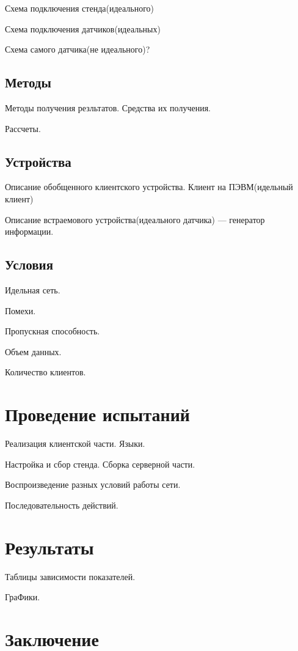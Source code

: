 \documentclass[russian]{article}
\begin{document}
Схема подключения стенда(идеального)

Схема подключения датчиков(идеальных)

Схема самого датчика(не идеального)?

\subsection*{Методы}

Методы получения резльтатов. Средства их получения.

Рассчеты.

\subsection*{Устройства}

Описание обобщенного клиентского устройства. Клиент на ПЭВМ(идельный клиент)

Описание встраемового устройства(идеального датчика) --- генератор информации.

\subsection*{Условия}

Идельная сеть.

Помехи.

Пропускная способность.

Объем данных.

Количество клиентов.

\section*{Проведение испытаний}

Реализация клиентской части. Языки.

Настройка и сбор стенда. Сборка серверной части.

Воспроизведение разных условий работы сети.

Последовательность действий.

\section*{Результаты}

Таблицы зависимости показателей.

ГраФики.

\section*{Заключение}
\end{document}
